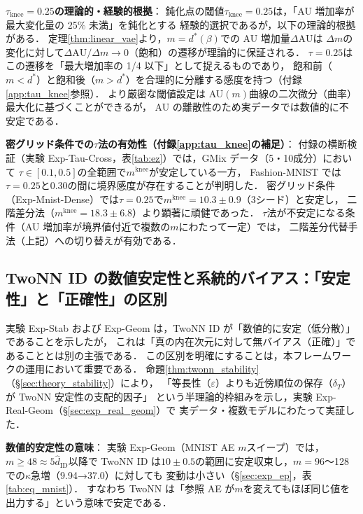 \documentclass[11pt,a4paper]{jsarticle}
\newcommand{\mknee}{m^{\mathrm{knee}}}
\begin{document}
\textbf{$\tau_{\mathrm{knee}} = 0.25$の理論的・経験的根拠}：
鈍化点の閾値$\tau_{\mathrm{knee}} = 0.25$は，「AU 増加率が最大変化量の 25\% 未満」を鈍化とする
経験的選択であるが，以下の理論的根拠がある．
定理\ref{thm:linear_vae}より，$m = d^*(\beta)$での AU 増加量$\Delta\mathrm{AU}$は
$\Delta m$の変化に対して$\Delta\mathrm{AU}/\Delta m \to 0$（飽和）の遷移が理論的に保証される．
$\tau = 0.25$はこの遷移を「最大増加率の 1/4 以下」として捉えるものであり，
飽和前（$m < d^*$）と飽和後（$m > d^*$）を合理的に分離する感度を持つ（付録\ref{app:tau_knee}参照）．
より厳密な閾値設定は AU$(m)$曲線の二次微分（曲率）最大化に基づくことができるが，
AU の離散性のため実データでは数値的に不安定である．

\textbf{密グリッド条件での$\tau$法の有効性（付録\ref{app:tau_knee}の補足）}：
付録の横断検証（実験 Exp-Tau-Cross，表\ref{tab:ez}）では，GMix データ（5・10成分）において
$\tau \in [0.1, 0.5]$の全範囲で$\mknee$が安定している一方，
Fashion-MNIST では$\tau = 0.25$と$0.30$の間に境界感度が存在することが判明した．
密グリッド条件（Exp-Mnist-Dense）では$\tau = 0.25$で$\mknee = 10.3 \pm 0.9$（3シード）と安定し，
二階差分法（$\mknee = 18.3 \pm 6.8$）より顕著に頑健であった．
$\tau$法が不安定になる条件（AU 増加率が境界値付近で複数の$m$にわたって一定）では，
二階差分代替手法（上記）への切り替えが有効である．

\subsection{TwoNN ID の数値安定性と系統的バイアス：「安定性」と「正確性」の区別}\label{sec:disc_twonn_bias}

実験 Exp-Stab および Exp-Geom は，TwoNN ID が「数値的に安定（低分散）」であることを示したが，
これは「真の内在次元に対して無バイアス（正確）」であることとは別の主張である．
この区別を明確にすることは，本フレームワークの運用において重要である．
命題\ref{thm:twonn_stability}（§\ref{sec:theory_stability}）により，
「等長性（$\varepsilon$）よりも近傍順位の保存（$\delta_T$）が TwoNN 安定性の支配的因子」
という半理論的枠組みを示し，実験 Exp-Real-Geom（§\ref{sec:exp_real_geom}）で
実データ・複数モデルにわたって実証した．

\textbf{数値的安定性の意味}：
実験 Exp-Geom（MNIST AE $m$スイープ）では，$m \geq 48 \approx 5\hat{d}_\mathrm{ID}$以降で
TwoNN ID は$10 \pm 0.5$の範囲に安定収束し，$m = 96$〜128 での$\kappa$急増（9.94→37.0）に対しても
変動は小さい（§\ref{sec:exp_ep}，表\ref{tab:eq_mnist}）．
すなわち TwoNN は「参照 AE が$m$を変えてもほぼ同じ値を出力する」という意味で安定である．
\end{document}
